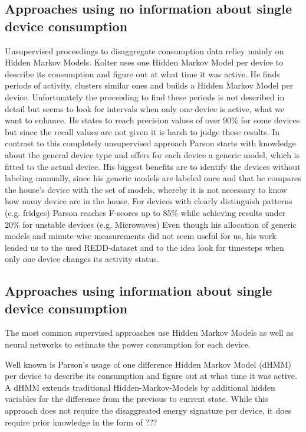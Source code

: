 \documentclass{article}
\begin{document}
\subsection{Approaches using no information about single device consumption}
Unsupervised proceedings to disaggregate consumption data reliey mainly on Hidden Markov Models. 
Kolter \cite{Kolter} uses one Hidden Markov Model per device to describe its consumption and figure out at what time 
it was active. He finds periods of activity, clusters similar ones and builds a Hidden Markov Model per device. 
Unfortunately the proceeding to find these periods is not described in detail but seems to look for intervals when only 
one device is active, what we want to enhance. He states to reach precision values of over 90\% for some devices but since the recall values are not 
given it is harsh to judge these results. 
In contrast to this completely unsupervised approach Parson starts with knowledge about the general device type and 
offers for each device a generic model, which is fitted to the actual device. His biggest benefits are to identify the 
devices without labeling manually, since his generic models are labeled once and that he compares the house's device with 
the set of models, whereby it is not necessary to know how many device are in the house. For devices with clearly distinguish patterns 
(e.g. fridges) Parson reaches F-scores up to 85\% while achieving results under 20\% for unstable devices (e.g. Microwaves)
Even though his allocation of generic models and minute-wise measurements did not seem useful for us, his work leaded 
us to the used REDD-dataset 
and to the idea look for timesteps when only one device changes its activity status.
\subsection{Approaches using information about single device consumption}

The most common supervised approaches use Hidden Markov Models as well as neural networks to estimate the power consumption 
for each device.

Well known is Parson's \cite{Parson} usage of one difference Hidden Markov Model (dHMM) per device to describe its 
consumption and figure out at what time it was active.
A dHMM extends traditional Hidden-Markov-Models by additional hidden variables for the difference from the previous 
to current state. While this approach does not require the disaggreated energy signature per device, it does require 
prior knowledge in the form of ???
\end{document}
